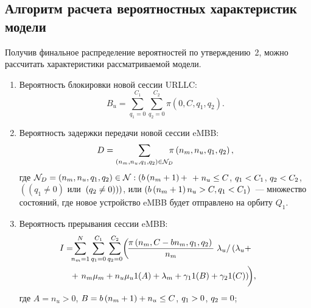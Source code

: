 \begin{multicols}{2}
\section{Алгоритм расчета вероятностных характеристик модели}

Получив финальное распределение вероятностей по утверждению~2, можно рассчитать характеристики 
рассматриваемой модели.
\begin{enumerate}[1.]
    \item Вероятность блокировки новой сессии URLLC:
    \begin{equation*}
    B_{u}=\sum\limits_{q_1=0}^{C_1}{\sum\limits_{q_2=0}^{C_2}\pi\left(0,C,q_1,q_2\right)}.
    \end{equation*}
    \item Вероятность задержки передачи новой сессии \mbox{eMBB}:
    \begin{equation*}
    D=\sum\limits_{\left(n_{m},n_{u},q_1,q_2\right)\in {\cal{N}}_{D}}\!\!\!\! \pi\left(n_{m},n_{u},q_1,q_2\right),
    \end{equation*}
    где 
    $\mathcal N_{D}=\left(n_{m},n_{u},q_1,q_2\right)\hm 
    \in \mathcal N: \left( b\left( n_{m}+1\right)+\right.$\linebreak
    $+\;n_{u} \hm\le C$, $q_1\hm<C_1$, $q_2\hm<C_2$,
    $\left(\left(q_1\neq 0\right)\right.$ {или} 
    $\left.\left.\left(q_2\hm\neq 0 \right)\right)\right)$, {или} 
    $\left(b\left(n_{m}\hm+1\right)n_{u}\hm>C,q_1\hm<C_1\right)$~--- 
    множество состояний, где новое устройство \mbox{eMBB} будет отправлено на орбиту $Q_ {1}$.
    \item Вероятность прерывания сессии \mbox{eMBB}:
    \begin{multline*}
   \hspace*{-8mm} I=\!\!\!\sum\limits_{n_{m} =1}^{N}\sum\limits_{q_{1} =0}^{C_{1} }
   \sum\limits_{q_{2} =0}^{C_{2} }\!
    \left(\!\fr{\pi\left(n_{m} ,C-bn_{m} ,q_{1} ,q_{2} \right)}{n_m}\right. \lambda_u  /
     \left(\lambda _{u} +\right.\hspace*{-0.4pt} \\
\left. \hspace*{-4.69067mm}{}+ \left.{} n_{m} \mu _{m} +n_{u} \mu _{u}
   1(A)+\lambda _{m} +\gamma _{1} 1(B)+\gamma _{2} 1(C)\right)
   \vphantom{\fr{\pi\left(n_{m} ,C-bn_{m} ,q_{1} ,q_{2} \right)}{n_m}}
     \!\!\right)\!,\hspace*{-6.28122pt}
    \end{multline*}
    где $A=n_{u}>0$, $B\hm=b\left( n_{m}\hm+1 \right)\hm+n_{u}\hm\le C$, $q_1\hm>0$, $q_2\hm=0$;     

\end{enumerate}
\end{multicols}
